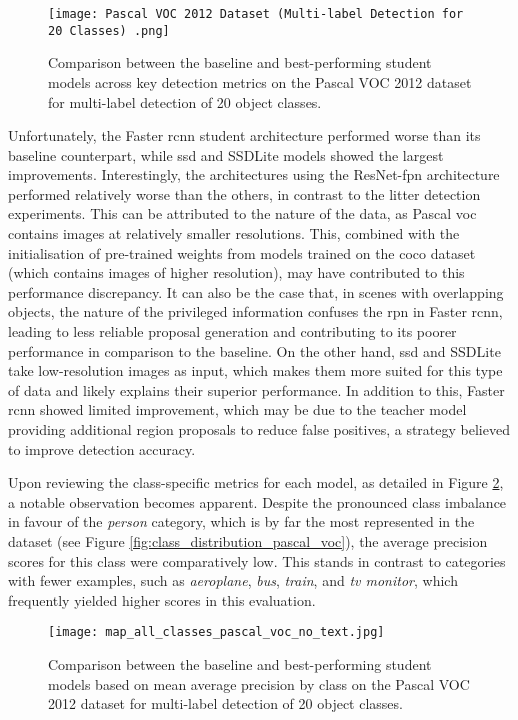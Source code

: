 \begin{figure}[!htbp]
    \centering
    \texttt{[image: Pascal VOC 2012 Dataset (Multi-label Detection for 20 Classes) .png]}
    \caption{Comparison between the baseline and best-performing student models across key detection metrics on the Pascal VOC 2012 dataset for multi-label detection of 20 object classes.}
    \label{fig:pascal_voc_bar}
\end{figure}

Unfortunately, the Faster \gls{rcnn} student architecture performed worse than its baseline counterpart, while \gls{ssd} and SSDLite models showed the largest improvements. Interestingly, the architectures using the ResNet-\gls{fpn} architecture performed relatively worse than the others, in contrast to the litter detection experiments. This can be attributed to the nature of the data, as Pascal \gls{voc} contains images at relatively smaller resolutions. This, combined with the initialisation of pre-trained weights from models trained on the \gls{coco} dataset (which contains images of higher resolution), may have contributed to this performance discrepancy. It can also be the case that, in scenes with overlapping objects, the nature of the privileged information confuses the \gls{rpn} in Faster \gls{rcnn}, leading to less reliable proposal generation and contributing to its poorer performance in comparison to the baseline. On the other hand, \gls{ssd} and SSDLite take low-resolution images as input, which makes them more suited for this type of data and likely explains their superior performance. In addition to this, Faster \gls{rcnn} showed limited improvement, which may be due to the teacher model providing additional region proposals to reduce false positives, a strategy believed to improve detection accuracy.

Upon reviewing the class-specific metrics for each model, as detailed in Figure \ref{fig:pascal_voc_per_class}, a notable observation becomes apparent.
 Despite the pronounced class imbalance in favour of the \textit{person} category, which is by far the most represented in the dataset (see Figure \ref{fig:class_distribution_pascal_voc}), the average precision scores for this class were comparatively low. This stands in contrast to categories with fewer examples, such as \textit{aeroplane}, \textit{bus}, \textit{train}, and \textit{tv monitor}, which frequently yielded higher scores in this evaluation.

\begin{figure}[!htbp]
    \centering
    \texttt{[image: map\_all\_classes\_pascal\_voc\_no\_text.jpg]}
    \caption{Comparison between the baseline and best-performing student models based on mean average precision by class on the Pascal VOC 2012 dataset for multi-label detection of 20 object classes.}
    \label{fig:pascal_voc_per_class}
\end{figure}

